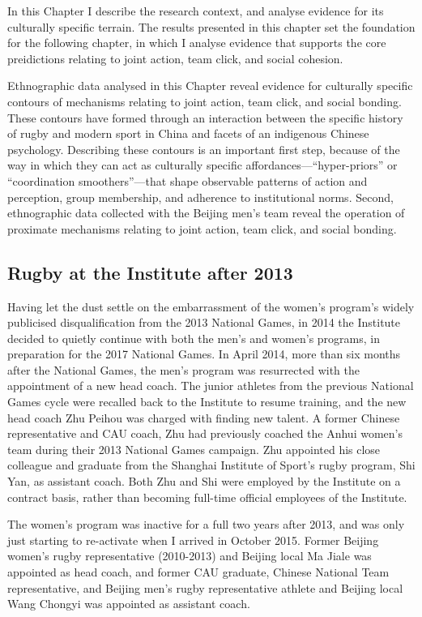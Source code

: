 \begin{CJK}{UTF8}{gbsn}
In this Chapter I describe the research context, and analyse evidence for its culturally specific terrain.  The results presented in this chapter set the foundation for the following chapter, in which I analyse evidence that supports the core preidictions relating to joint action, team click, and social cohesion.

Ethnographic data analysed in this Chapter reveal evidence for culturally specific contours of mechanisms relating to joint action, team click, and social bonding.  These contours have formed through an interaction between the specific history of rugby and modern sport in China and facets of an indigenous Chinese psychology.  Describing these contours is an important first step, because of the way in which they can act as culturally specific affordances---``hyper-priors'' or ``coordination smoothers''---that shape observable patterns of action and perception, group membership, and adherence to institutional norms.  Second, ethnographic data collected with the Beijing men's team reveal the operation of proximate mechanisms relating to joint action, team click, and social bonding.




\subsection{Rugby at the Institute after 2013}
Having let the dust settle on the embarrassment of the women's program's widely publicised disqualification from the 2013 National Games, in 2014 the Institute decided to quietly continue with both the men's and women's programs, in preparation for the 2017 National Games.  In April 2014, more than six months after the National Games, the men's program was resurrected with the appointment of a new head coach. The junior athletes from the previous National Games cycle were recalled back to the Institute to resume training, and the new head coach Zhu Peihou was charged with finding new talent. A former Chinese representative and CAU coach, Zhu had previously coached the Anhui women's team during their 2013 National Games campaign.  Zhu appointed his close colleague and graduate from the Shanghai Institute of Sport's rugby program, Shi Yan, as assistant coach.  Both Zhu and Shi were employed by the Institute on a contract basis, rather than becoming full-time official employees of the Institute.

The women's program was inactive for a full two years after 2013, and was only just starting to re-activate when I arrived in October 2015.  Former Beijing women's rugby representative (2010-2013) and Beijing local Ma Jiale was appointed as head coach, and former CAU graduate, Chinese National Team representative, and Beijing men's rugby representative athlete and Beijing local Wang Chongyi was appointed as assistant coach.


\end{CJK}
